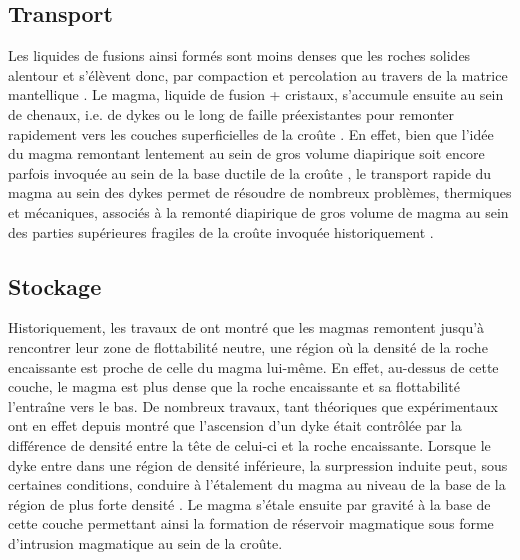 \subsection{Transport}
\label{sec:transport}

Les liquides de fusions ainsi formés  sont moins denses que les roches
solides alentour et  s'élèvent donc, par compaction  et percolation au
travers          de           la          matrice          mantellique
\citep{McKenzy:1984bo,McKenzie:1985jq}. Le magma,  liquide de fusion +
cristaux, s'accumule ensuite au sein de  chenaux, i.e.  de dykes ou le
long  de  faille  préexistantes  pour remonter  rapidement  vers  les
couches          superficielles          de         la          croûte
\citep{Lister:1991ut,Clemens:1992kr,Petford:1993bk,Rubin:1995upa}.  En
effet, bien  que l'idée du magma  remontant lentement au sein  de gros
volume  diapirique soit  encore parfois  invoquée  au sein  de la  base
ductile  de  la   croûte  \citep{Weinberg:1994jg,Weinberg:1996vb},  le
transport rapide  du magma  au sein  des dykes  permet de  résoudre de
nombreux problèmes,  thermiques et  mécaniques, associés à  la remonté
diapirique de  gros volume  de magma au  sein des  parties supérieures
fragiles de la croûte invoquée historiquement \citep{Miller:1999km}.

\subsection{Stockage}
\label{sec:stockage}

Historiquement, les  travaux de  \citet{Walker:1989jq} ont  montré que
les  magmas remontent  jusqu'à  rencontrer leur  zone de  flottabilité
neutre, une région où la densité de la roche encaissante est proche de
celle du magma lui-même. En effet, au-dessus de cette couche, le magma
est plus dense que la  roche encaissante et sa flottabilité l'entraîne
vers    le    bas.     De   nombreux    travaux,    tant    théoriques
\citep{Lister:1991ut,Petford:1993bk,Rubin:1995upa}  que  expérimentaux
\citep{Taisne:2009kj,Taisne:2011do}  ont en  effet  depuis montré  que
l'ascension d'un  dyke était  contrôlée par  la différence  de densité
entre la  tête de celui-ci  et la  roche encaissante. Lorsque  le dyke
entre dans  une région de  densité inférieure, la  surpression induite
peut, sous  certaines conditions, conduire  à l'étalement du  magma au
niveau   de   la  base   de   la   région   de  plus   forte   densité
\citep{Taisne:2011do}. Le magma s'étale ensuite  par gravité à la base
de cette couche permettant ainsi  la formation de réservoir magmatique
sous forme d'intrusion magmatique au sein de la croûte.

